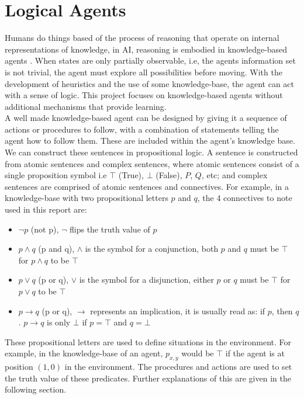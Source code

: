 \section{Logical Agents}
Humans do things based of the process of reasoning that operate on internal representations of knowledge, in AI, reasoning is embodied in knowledge-based agents \cite[Chapter 7]{russell2016artificial}. When states are only partially observable, i.e, the agents information set is not trivial, the agent must explore all possibilities before moving. With the development of heuristics and the use of some knowledge-base, the agent can act with a sense of logic. This project focuses on knowledge-based agents without additional mechanisms that provide learning.\\

\noindent A well made knowledge-based agent can be designed by giving it a sequence of actions or procedures to follow, with a combination of statements telling the agent how to follow them. \cite[Chapter 7]{russell2016artificial} These are included within the agent's knowledge base. We can construct these sentences in propositional logic. A sentence is constructed from atomic sentences and complex sentences, where atomic sentences consist of a single proposition symbol i.e $\top$ (True), $\bot$ (False), $P$, $Q$, etc; and complex sentences are comprised of atomic sentences and connectives. For example, in a knowledge-base with two propositional letters $p$ and $q$, the 4 connectives to note \cite[Chapter 7]{russell2016artificial} used in this report are:

\begin{itemize}
    \item $\neg p$ (not p), $\neg$ flips the truth value of $p$
    \item $p \land q$ (p and q), $\land$ is the symbol for a conjunction, both $p$ and $q$ must be $\top$ for $p \land q$ to be $\top$ 
    \item $p \lor q$ (p or q), $\lor$ is the symbol for a disjunction, either $p$ or $q$ must be $\top$ for $p \lor q$ to be $\top$
    \item $p \rightarrow q$ (p or q), $\rightarrow$ represents an implication, it is usually read as: if $p$, then $q$. $p \rightarrow q$ is only $\bot$ if $p = \top$ and $q = \bot$ 
\end{itemize}

\noindent These propositional letters are used to define situations in the environment. For example, in the knowledge-base of an agent, $p_{x, y}$ would be $\top$ if the agent is at position $(1, 0)$ in the environment. The procedures and actions are used to set the truth value of these predicates. Further explanations of this are given in the following section.

